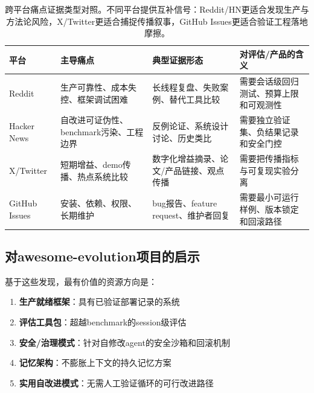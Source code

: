 \begin{table}[htbp]
\centering
\small
\begin{tabular}{p{30mm}p{34mm}p{38mm}p{38mm}}
\toprule
\textbf{平台} & \textbf{主导痛点} & \textbf{典型证据形态} & \textbf{对评估/产品的含义} \\
\midrule
Reddit & 生产可靠性、成本失控、框架调试困难 & 长线程复盘、失败案例、替代工具比较 & 需要会话级回归测试、预算上限和可观测性 \\
Hacker News & 自改进可证伪性、benchmark污染、工程边界 & 反例论证、系统设计讨论、历史类比 & 需要独立验证集、负结果记录和安全门控 \\
X/Twitter & 短期增益、demo传播、热点系统比较 & 数字化增益摘录、论文/产品链接、观点传播 & 需要把传播指标与可复现实验分离 \\
GitHub Issues & 安装、依赖、权限、长期维护 & bug报告、feature request、维护者回复 & 需要最小可运行样例、版本锁定和回滚路径 \\
\bottomrule
\end{tabular}
\caption{跨平台痛点证据类型对照。不同平台提供互补信号：Reddit/HN更适合发现生产与方法论风险，X/Twitter更适合捕捉传播叙事，GitHub Issues更适合验证工程落地摩擦。}
\label{tab:ch7-platform-evidence}
\end{table}

\subsection{对awesome-evolution项目的启示}

基于这些发现，最有价值的资源方向是：

\begin{enumerate}[nosep]
\item \textbf{生产就绪框架}：具有已验证部署记录的系统
\item \textbf{评估工具包}：超越benchmark的session级评估
\item \textbf{安全/治理模式}：针对自修改agent的安全沙箱和回滚机制
\item \textbf{记忆架构}：不膨胀上下文的持久记忆方案
\item \textbf{实用自改进模式}：无需人工验证循环的可行改进路径
\end{enumerate}

